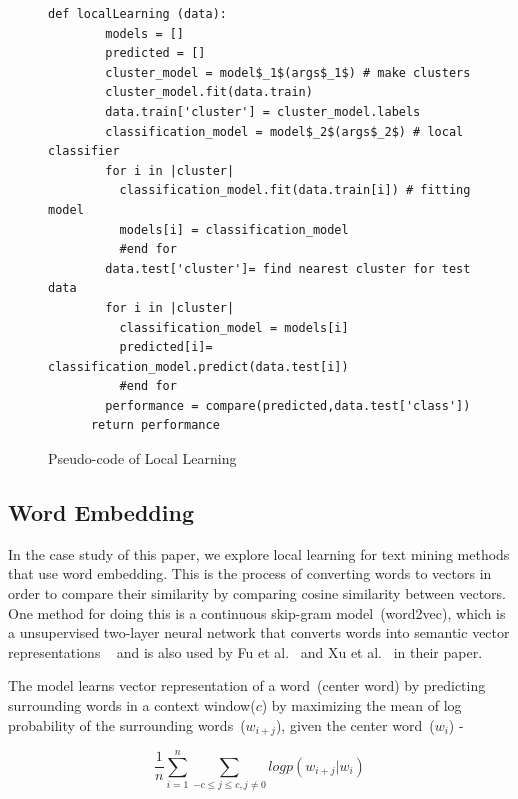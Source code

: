 \documentclass[sigconf]{acmart}
\theoremstyle{break}
\begin{document}
     
    \begin{figure}[!t]
    \small
     \begin{lstlisting}[mathescape,linewidth=7.5cm,frame=none,numbers=right]
      def localLearning (data):
        models = []
        predicted = []
        cluster_model = model$_1$(args$_1$) # make clusters
        cluster_model.fit(data.train)
        data.train['cluster'] = cluster_model.labels
        classification_model = model$_2$(args$_2$) # local classifier
        for i in |cluster|
          classification_model.fit(data.train[i]) # fitting model
          models[i] = classification_model
          #end for
        data.test['cluster']= find nearest cluster for test data
        for i in |cluster|
          classification_model = models[i]
          predicted[i]= classification_model.predict(data.test[i])
          #end for
        performance = compare(predicted,data.test['class'])
      return performance    

            \end{lstlisting} 
            \vspace{-0.2cm}
            \caption{Pseudo-code of Local Learning}
            \label{fig:local_Learning} 
            \vspace{-0.3cm}
    \end{figure}

    
    \subsection{Word Embedding}
    \label{sssec:Word Embedding}
    In the case study of this paper, we explore local learning for text
    mining methods that use word embedding. 
    This is the process of converting words to vectors in order to compare their similarity by comparing cosine similarity between vectors. One method for doing this is a continuous skip-gram model~(word2vec), which is a unsupervised two-layer neural network that converts words into semantic vector representations ~\cite{mikolov2013distributed} and is also used by Fu et al.~\cite{fu2017easy} and Xu et al.~\cite{xu2016predicting} in their paper.
    
    The model learns vector representation of a word~(center word) by predicting surrounding words in a context window($c$) by maximizing the mean of log probability of the surrounding words~($w_{i+j}$), given the center word~($w_{i}$) - 
    
     \begin{equation}
        \frac{1}{n}\sum_{i=1}^{n} \sum_{-c\leq j \leq c, j \neq 0} log p(w_{i+j}|w_i)
    \end{equation}
    
\end{document}
